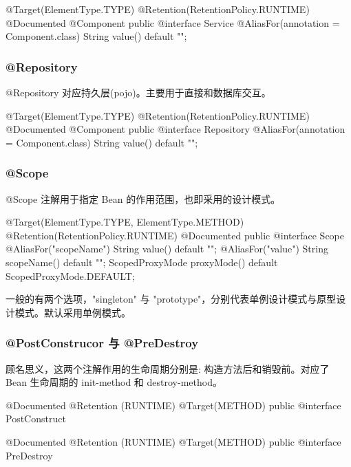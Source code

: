 \begin{Java}
@Target(ElementType.TYPE)
@Retention(RetentionPolicy.RUNTIME)
@Documented
@Component
public @interface Service {
    @AliasFor(annotation = Component.class)
    String value() default "";
}
\end{Java}

\subsubsection{@Repository}

@Repository 对应持久层(pojo)。主要用于直接和数据库交互。

\begin{Java}
@Target(ElementType.TYPE)
@Retention(RetentionPolicy.RUNTIME)
@Documented
@Component
public @interface Repository {
    @AliasFor(annotation = Component.class)
    String value() default "";
}
\end{Java}

\subsubsection{@Scope}

@Scope 注解用于指定 Bean 的作用范围，也即采用的设计模式。

\begin{Java}
@Target({ElementType.TYPE, ElementType.METHOD})
@Retention(RetentionPolicy.RUNTIME)
@Documented
public @interface Scope {
    @AliasFor("scopeName")
	String value() default "";
	@AliasFor("value")
	String scopeName() default "";
    ScopedProxyMode proxyMode() default ScopedProxyMode.DEFAULT;
}
\end{Java}
一般的有两个选项，"singleton" 与 "prototype"，分别代表单例设计模式与原型设计模式。默认采用单例模式。

\subsubsection{@PostConstrucor 与 @PreDestroy}

顾名思义，这两个注解作用的生命周期分别是: 构造方法后和销毁前。对应了 Bean 生命周期的 init-method 和 destroy-method。

\begin{Java}
@Documented
@Retention (RUNTIME)
@Target(METHOD)
public @interface PostConstruct

@Documented
@Retention (RUNTIME)
@Target(METHOD)
public @interface PreDestroy

\end{Java}

